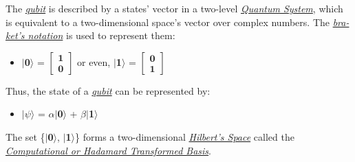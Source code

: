 \documentclass[conference]{IEEEtran}
\begin{document}
\vspace{4pt}

The \href{https://en.wikipedia.org/wiki/Qubit}{\textit{qubit}} is described by a states' vector in a two-level \href{https://en.wikipedia.org/wiki/Quantum_system}{\textit{Quantum System}}, which is equivalent to a two-dimensional space's vector over complex numbers. The \href{https://en.wikipedia.org/wiki/Bra\%E2\%80\%93ket_notation}{\textit{bra-ket's notation}} is used to represent them:

\vspace{4pt}

\begin{itemize}
    \item 
    \begin{center}
        $\mid$\textbf{0}$\rangle$ = ${
            \begin{bmatrix}
                \textbf{1}\\
                \textbf{0}
            \end{bmatrix}}$ 
        or even, 
        $\mid$\textbf{1}$\rangle$ = ${
            \begin{bmatrix}
                \textbf{0}\\
                \textbf{1}
            \end{bmatrix}}$ 
    \end{center}
\end{itemize}

\vspace{4pt}

Thus, the state of a \href{https://en.wikipedia.org/wiki/Qubit}{\textit{qubit}} can be represented by:

\vspace{4pt}

\begin{itemize}
    \item 
    \begin{center}
        $\mid$$\psi$$\rangle$ = $\alpha$$\mid$\textbf{0}$\rangle$ + $\beta$$\mid$\textbf{1}$\rangle$
    \end{center}
\end{itemize}

\vspace{4pt}

The set \{$\mid$\textbf{0}$\rangle$, $\mid$\textbf{1}$\rangle$\} forms a two-dimensional \href{https://en.wikipedia.org/wiki/Hilbert_space}{\textit{Hilbert's Space}} called the \href{https://en.wikipedia.org/wiki/Controlled_NOT_gate#Behaviour_in_the_Hadamard_transformed_basis}{\textit{Computational or Hadamard Transformed Basis}}.
\end{document}
